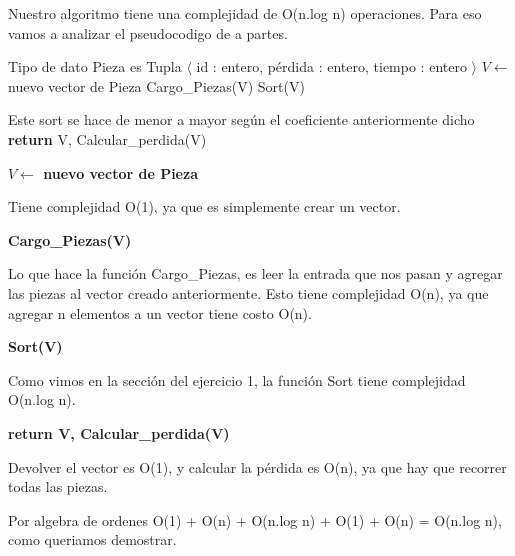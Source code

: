 Nuestro algoritmo tiene una complejidad de O(n.log n) operaciones. Para eso vamos a analizar el pseudocodigo de a partes.

\begin{pseudo}
\State Tipo de dato Pieza es Tupla $\langle$ id : entero, pérdida : entero, tiempo : entero $\rangle$
        \State $V \leftarrow$ nuevo vector de Pieza 
        \State Cargo\_Piezas(V) 
        \State Sort(V) 
        
        \Comment Este sort se hace de menor a mayor según el coeficiente anteriormente dicho
        \State \textbf{return} V, Calcular\_perdida(V) 
    \EndProcedure
\end{pseudo}

\begin{pseudo}
 \State  \textbf{$V \leftarrow$ nuevo vector de Pieza}
\end{pseudo}

Tiene complejidad O(1), ya que es simplemente crear un vector.

\begin{pseudo}
 \State \textbf{Cargo\_Piezas(V)}
\end{pseudo}

Lo que hace la función Cargo\_Piezas, es leer la entrada que nos pasan y agregar las piezas al vector creado anteriormente. Esto tiene complejidad O(n), ya que agregar n elementos a un vector tiene costo O(n).

\begin{pseudo}
 \State \textbf{Sort(V)}
\end{pseudo}

Como vimos en la sección del ejercicio 1, la función Sort tiene complejidad O(n.log n).

\begin{pseudo}
 \State \textbf{return V, Calcular\_perdida(V)}
\end{pseudo}

Devolver el vector es O(1), y calcular la pérdida es O(n), ya que hay que recorrer todas las piezas.

Por algebra de ordenes O(1) + O(n) + O(n.log n) + O(1) + O(n) = O(n.log n), como queriamos demostrar.